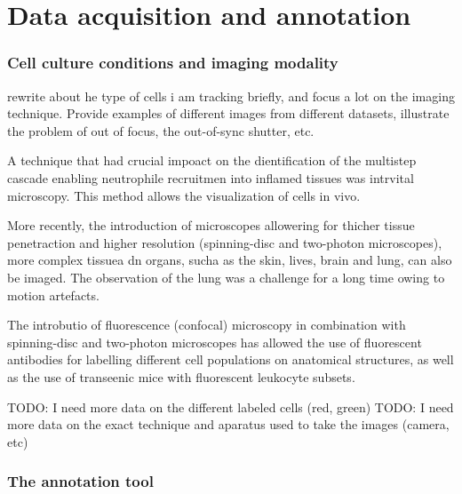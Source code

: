 \chapter{Data acquisition and annotation }


    \subsection{Cell culture conditions and imaging modality }
    
    rewrite about he type of cells i am tracking briefly, and focus a lot on the imaging technique. Provide examples of different images from different datasets,
    illustrate the problem of out of focus, the out-of-sync shutter, etc.
    
    
    A technique that had crucial impoact on the dientification of the multistep cascade enabling neutrophile recruitmen into inflamed tissues was intrvital microscopy. This method allows the visualization of cells in vivo.
    
    More recently, the introduction of microscopes allowering for thicher tissue penetraction and higher resolution (spinning-disc and two-photon microscopes), more complex tissuea dn organs, sucha as the skin, lives, brain and lung, can also be imaged. The observation of the lung was a challenge for a long time owing to motion artefacts. 
    
    The introbutio of fluorescence (confocal) microscopy  in combination with spinning-disc and two-photon microscopes  has allowed the use of fluorescent antibodies for labelling different cell populations on anatomical structures, as well as the use of transeenic mice with fluorescent leukocyte subsets. 
    
    TODO: I need more data on the different labeled cells (red, green)
    TODO: I need more data on the exact technique and aparatus used to take the images (camera, etc)
    
    \subsection{The annotation tool \statusnew}
    
    
    	
